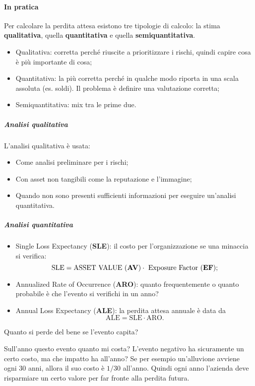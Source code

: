 \paragraph*{In pratica}

Per calcolare la perdita attesa esistono tre tipologie di calcolo: la stima
\textbf{qualitativa}, quella \textbf{quantitativa} e quella
\textbf{semiquantitativa}.

\begin{itemize}
\item Qualitativa: corretta perché riuscite a prioritizzare i rischi, quindi
capire cosa è più importante di cosa;
\item Quantitativa: la più corretta perché in qualche modo riporta in una scala
assoluta (es. soldi). Il problema è definire una valutazione corretta;
\item Semiquantitativa: mix tra le prime due.
\end{itemize}

\subparagraph*{Analisi qualitativa}

L'analisi qualitativa è usata:
\begin{itemize}
\item Come analisi preliminare per i rischi;
\item Con asset non tangibili come la reputazione e l'immagine;
\item Quando non sono presenti sufficienti informazioni per eseguire
un'analisi quantitativa.
\end{itemize}

\subparagraph*{Analisi quantitativa}

\begin{itemize}
\item Single Loss Expectancy (\textbf{SLE}): il costo per l'organizzazione se
una minaccia si verifica:
$$
\text{SLE} = \text{ASSET VALUE (\textbf{AV})} \cdot \text{ Exposure Factor
(\textbf{EF})};
$$
\item Annualized Rate of Occurrence (\textbf{ARO}): quanto frequentemente o
quanto probabile è che l'evento si verifichi in un anno?
\item Annual Loss Expectancy (\textbf{ALE}): la perdita attesa annuale è data
da
$$
\text{ALE} = \text{SLE} \cdot \text{ARO}.
$$
\end{itemize}

Quanto si perde del bene se l'evento capita?

Sull'anno questo evento quanto mi costa? L'evento negativo ha sicuramente un
certo costo, ma che impatto ha all'anno? Se per esempio un'alluvione avviene
ogni 30 anni, allora il suo costo è $1/30$ all'anno. Quindi ogni anno l'azienda
deve risparmiare un certo valore per far fronte alla perdita futura.

